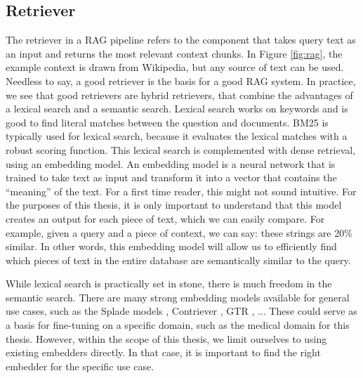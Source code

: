 \subsection{Retriever}
The retriever in a RAG pipeline refers to the component that takes query text as an input and returns the most relevant context chunks. In Figure \ref{fig:rag}, the example context is drawn from Wikipedia, but any source of text can be used. Needless to say, a good retriever is the basis for a good RAG system. In practice, we see that good retrievers are hybrid retrievers, that combine the advantages of a lexical search and a semantic search. Lexical search works on keywords and is good to find literal matches between the question and documents. BM25 \cite{robertson2009probabilistic} is typically used for lexical search, because it evaluates the lexical matches with a robust scoring function. This lexical search is complemented with dense retrieval, using an embedding model. An embedding model is a neural network that is trained to take text as input and transform it into a vector that contains the ``meaning'' of the text. For a first time reader, this might not sound intuitive. For the purposes of this thesis, it is only important to understand that this model creates an output for each piece of text, which we can easily compare. For example, given a query and a piece of context, we can say: these strings are 20\% similar. In other words, this embedding model will allow us to efficiently find which pieces of text in the entire database are semantically similar to the query. 

While lexical search is practically set in stone, there is much freedom in the semantic search. There are many strong embedding models available for general use cases, such as the Splade models \cite{formal2021splade, formal2021spladev2, lassance2024spladev3}, Contriever \cite{izacard2021unsupervisedcontriever}, GTR \cite{ni2021largegtr}, ... These could serve as a basis for fine-tuning on a specific domain, such as the medical domain for this thesis. However, within the scope of this thesis, we limit ourselves to using existing embedders directly. In that case, it is important to find the right embedder for the specific use case.

